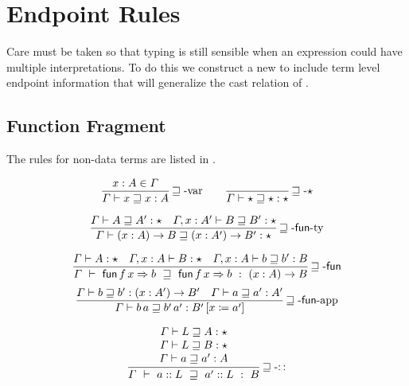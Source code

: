 \section{Endpoint Rules}

Care must be taken so that typing is still sensible when an expression could have multiple interpretations.
To do this we construct a new \csys{} to include term level endpoint information that will generalize the cast relation of .

\subsection{Function Fragment}
The rules for non-data terms are listed in .

\begin{figure}

\begin{align*}
 \frac{x:A\in\varGamma}{\varGamma\vdash x\sqsupseteq x:A}\rulename{\sqsupseteq-var}
  \quad & \quad 
  \frac{\ }{\varGamma\vdash\star\sqsupseteq\star:\star}\rulename{\sqsupseteq-\star}
  \\
\end{align*}

\[
\frac{
\varGamma\vdash A\sqsupseteq A':\star \quad
\varGamma,x:A'\vdash B\sqsupseteq B':\star
}{
  \varGamma\vdash\left(x:A\right)\rightarrow B\sqsupseteq\left(x:A'\right)\rightarrow B':\star
}\operatorname{\sqsupseteq-\mathsf{fun}-ty}
\]

\[
\frac{
\varGamma\vdash A:\star\quad\varGamma,x:A\vdash B:\star \quad
\varGamma,x:A\vdash b\sqsupseteq b':B
}{
  \varGamma\ \vdash\ \mathsf{fun}\,f\,x\Rightarrow b\ \sqsupseteq\ \mathsf{fun}\,f\,x\Rightarrow b\ :\ \left(x:A\right)\rightarrow B
}\rulename{\sqsupseteq-\mathsf{fun}}
\]
\[
\frac{
\varGamma\vdash b\sqsupseteq b':\left(x:A'\right)\rightarrow B' \quad
\varGamma\vdash a\sqsupseteq a':A'
}{
  \varGamma\vdash b\,a\sqsupseteq b'\,a':B'\left[x\coloneqq a'\right]
}\operatorname{\sqsupseteq-\mathsf{fun}-app}
\]

\[
\frac{\begin{array}{c}
  \varGamma\vdash L\sqsupseteq A:\star\\
  \varGamma\vdash L\sqsupseteq B:\star\\
  \varGamma\vdash a\sqsupseteq a':A
  \end{array}}{\varGamma\ \vdash\ a::L\ \sqsupseteq\ a'::L\ :\ B}\rulename{\sqsupseteq-::}
\]


\end{figure}
